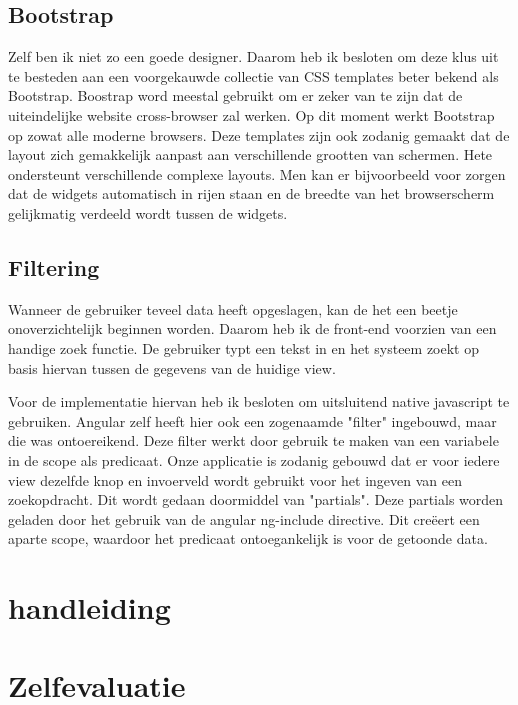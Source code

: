 \documentclass[a4paper,11pt]{article}
\begin{document}
\subsection{Bootstrap}
Zelf ben ik niet zo een goede designer. Daarom heb ik besloten om deze klus uit te besteden aan een voorgekauwde collectie van CSS templates beter bekend als Bootstrap. Boostrap word meestal gebruikt om er zeker van te zijn dat de uiteindelijke website cross-browser zal werken. Op dit moment werkt Bootstrap op zowat alle moderne browsers. Deze templates zijn ook zodanig gemaakt dat de layout zich gemakkelijk aanpast aan verschillende grootten van schermen. Hete ondersteunt verschillende complexe layouts. Men kan er bijvoorbeeld voor zorgen dat de widgets automatisch in rijen staan en de breedte van het browserscherm gelijkmatig verdeeld wordt tussen de widgets.

\subsection{Filtering}
Wanneer de gebruiker teveel data heeft opgeslagen, kan de het een beetje onoverzichtelijk beginnen worden. Daarom heb ik de front-end voorzien van een handige zoek functie. De gebruiker typt een tekst in en het systeem zoekt op basis hiervan tussen de gegevens van de huidige view.

Voor de implementatie hiervan heb ik besloten om uitsluitend native javascript te gebruiken. Angular zelf heeft hier ook een zogenaamde "filter" ingebouwd, maar die was ontoereikend. Deze filter werkt door gebruik te maken van een variabele in de scope als predicaat. Onze applicatie is zodanig gebouwd dat er voor iedere view dezelfde knop en invoerveld wordt gebruikt voor het ingeven van een zoekopdracht. Dit wordt gedaan doormiddel van "partials". Deze partials worden geladen door het gebruik van de angular ng-include directive. Dit creëert een aparte scope, waardoor het predicaat ontoegankelijk is voor de getoonde data.


\section{handleiding}

\section{Zelfevaluatie}
\end{document}
